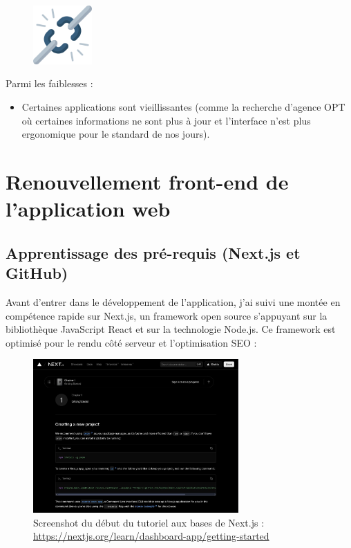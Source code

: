 \documentclass[12pt,a4paper]{report}
\begin{document}
\vspace{1cm}
\begin{figure}[h] %
    \centering
    \includegraphics[width=0.2\textwidth]{ressources_rapport/faiblesses.png}
\end{figure}
Parmi les faiblesses : 
\begin{itemize}
    \item Certaines applications sont vieillissantes (comme la recherche d'agence OPT où certaines informations ne sont plus à jour et l'interface n'est plus ergonomique pour le standard de nos jours).
\end{itemize}

\chapter{Renouvellement front-end de l'application web}
\section{Apprentissage des pré-requis (Next.js et GitHub)}
Avant d’entrer dans le développement de l'application, j’ai suivi une montée en compétence rapide sur Next.js, un framework open source s'appuyant sur la bibliothèque JavaScript React et sur la technologie Node.js. Ce framework est optimisé pour le rendu côté serveur et l’optimisation SEO : 

\vspace{1cm}
\begin{figure}[h] %
    \centering
    \includegraphics[width=0.7\textwidth]{ressources_rapport/learn_next.JPG}
    \caption{Screenshot du début du tutoriel aux bases de Next.js : \href{https://nextjs.org/learn/dashboard-app/getting-started}{https://nextjs.org/learn/dashboard-app/getting-started}}
\end{figure}
\end{document}
